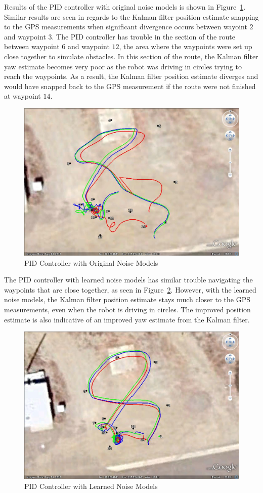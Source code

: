 Results of the PID controller with original noise models is shown in Figure~\ref{fig:kfResults3}. Similar results are seen in regards to the Kalman filter position estimate snapping to the GPS measurements when significant divergence occurs between wayoint $2$ and waypoint $3$. The PID controller has trouble in the section of the route between waypoint $6$ and waypoint $12$, the area where the waypoints were set up close together to simulate obstacles. In this section of the route, the Kalman filter yaw estimate becomes very poor as the robot was driving in circles trying to reach the waypoints. As a result, the Kalman filter position estimate diverges and would have snapped back to the GPS measurement if the route were not finished at waypoint $14$.

\begin{figure}[ht!]
\centering
\includegraphics[width=.75\textwidth]{images/GE/20101203_1755_kf_pidOrigQR}
\caption{PID Controller with Original Noise Models}
\label{fig:kfResults3}
\end{figure}

The PID controller with learned noise models has similar trouble navigating the waypoints that are close together, as seen in Figure~\ref{fig:kfResults4}. However, with the learned noise models, the Kalman filter position estimate stays much closer to the GPS measurements, even when the robot is driving in circles. The improved position estimate is also indicative of an improved yaw estimate from the Kalman filter.

\begin{figure}[ht!]
\centering
\includegraphics[width=.75\textwidth]{images/GE/20101203_1751_kf_pidNewQR}
\caption{PID Controller with Learned Noise Models}
\label{fig:kfResults4}
\end{figure}

